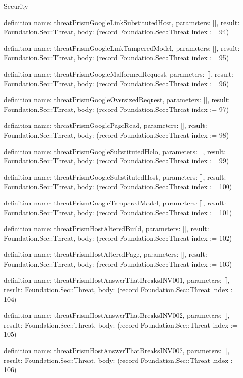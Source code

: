 \begin{lexlean}{Security}
\begin{semanticmodule}
definition{
  name: threatPrismGoogleLinkSubstitutedHost,
  parameters: [],
  result: Foundation.Sec::Threat,
  body: (record Foundation.Sec::Threat {index := 94})
}

definition{
  name: threatPrismGoogleLinkTamperedModel,
  parameters: [],
  result: Foundation.Sec::Threat,
  body: (record Foundation.Sec::Threat {index := 95})
}

definition{
  name: threatPrismGoogleMalformedRequest,
  parameters: [],
  result: Foundation.Sec::Threat,
  body: (record Foundation.Sec::Threat {index := 96})
}

definition{
  name: threatPrismGoogleOversizedRequest,
  parameters: [],
  result: Foundation.Sec::Threat,
  body: (record Foundation.Sec::Threat {index := 97})
}

definition{
  name: threatPrismGooglePageRead,
  parameters: [],
  result: Foundation.Sec::Threat,
  body: (record Foundation.Sec::Threat {index := 98})
}

definition{
  name: threatPrismGoogleSubstitutedHolo,
  parameters: [],
  result: Foundation.Sec::Threat,
  body: (record Foundation.Sec::Threat {index := 99})
}

definition{
  name: threatPrismGoogleSubstitutedHost,
  parameters: [],
  result: Foundation.Sec::Threat,
  body: (record Foundation.Sec::Threat {index := 100})
}

definition{
  name: threatPrismGoogleTamperedModel,
  parameters: [],
  result: Foundation.Sec::Threat,
  body: (record Foundation.Sec::Threat {index := 101})
}

definition{
  name: threatPrismHostAlteredBuild,
  parameters: [],
  result: Foundation.Sec::Threat,
  body: (record Foundation.Sec::Threat {index := 102})
}

definition{
  name: threatPrismHostAlteredPage,
  parameters: [],
  result: Foundation.Sec::Threat,
  body: (record Foundation.Sec::Threat {index := 103})
}

definition{
  name: threatPrismHostAnswerThatBreaksINV001,
  parameters: [],
  result: Foundation.Sec::Threat,
  body: (record Foundation.Sec::Threat {index := 104})
}

definition{
  name: threatPrismHostAnswerThatBreaksINV002,
  parameters: [],
  result: Foundation.Sec::Threat,
  body: (record Foundation.Sec::Threat {index := 105})
}

definition{
  name: threatPrismHostAnswerThatBreaksINV003,
  parameters: [],
  result: Foundation.Sec::Threat,
  body: (record Foundation.Sec::Threat {index := 106})
}


\end{semanticmodule}
\end{lexlean}
